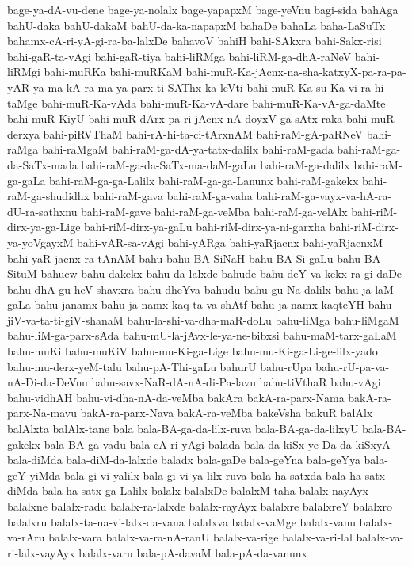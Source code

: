 {bage-ya-dA-vu-dene
bage-ya-nolalx
bage-yapapxM
bage-yeVnu
bagi-sida
bahAga
bahU-daka
bahU-dakaM
bahU-da-ka-napapxM
bahaDe
bahaLa
baha-LaSuTx
bahamx-cA-ri-yA-gi-ra-ba-lalxDe
bahavoV
bahiH
bahi-SAkxra
bahi-Sakx-risi
bahi-gaR-ta-vAgi
bahi-gaR-tiya
bahi-liRMga
bahi-liRM-ga-dhA-raNeV
bahi-liRMgi
bahi-muRKa
bahi-muRKaM
bahi-muR-Ka-jAcnx-na-sha-katxyX-pa-ra-pa-yAR-ya-ma-kA-ra-ma-ya-parx-ti-SAThx-ka-leVti
bahi-muR-Ka-su-Ka-vi-ra-hi-taMge
bahi-muR-Ka-vAda
bahi-muR-Ka-vA-dare
bahi-muR-Ka-vA-ga-daMte
bahi-muR-KiyU
bahi-muR-dArx-pa-ri-jAcnx-nA-doyxV-ga-sAtx-raka
bahi-muR-derxya
bahi-piRVThaM
bahi-rA-hi-ta-ci-tArxnAM
bahi-raM-gA-paRNeV
bahi-raMga
bahi-raMgaM
bahi-raM-ga-dA-ya-tatx-dalilx
bahi-raM-gada
bahi-raM-ga-da-SaTx-mada
bahi-raM-ga-da-SaTx-ma-daM-gaLu
bahi-raM-ga-dalilx
bahi-raM-ga-gaLa
bahi-raM-ga-ga-Lalilx
bahi-raM-ga-ga-Lanunx
bahi-raM-gakekx
bahi-raM-ga-shudidhx
bahi-raM-gava
bahi-raM-ga-vaha
bahi-raM-ga-vayx-va-hA-ra-dU-ra-sathxnu
bahi-raM-gave
bahi-raM-ga-veMba
bahi-raM-ga-velAlx
bahi-riM-dirx-ya-ga-Lige
bahi-riM-dirx-ya-gaLu
bahi-riM-dirx-ya-ni-garxha
bahi-riM-dirx-ya-yoVgayxM
bahi-vAR-sa-vAgi
bahi-yARga
bahi-yaRjacnx
bahi-yaRjacnxM
bahi-yaR-jacnx-ra-tAnAM
bahu
bahu-BA-SiNaH
bahu-BA-Si-gaLu
bahu-BA-SituM
bahucw
bahu-dakekx
bahu-da-lalxde
bahude
bahu-deY-va-kekx-ra-gi-daDe
bahu-dhA-gu-heV-shavxra
bahu-dheYva
bahudu
bahu-gu-Na-dalilx
bahu-ja-laM-gaLa
bahu-janamx
bahu-ja-namx-kaq-ta-va-shAtf
bahu-ja-namx-kaqteYH
bahu-jiV-va-ta-ti-giV-shanaM
bahu-la-shi-va-dha-maR-doLu
bahu-liMga
bahu-liMgaM
bahu-liM-ga-parx-sAda
bahu-mU-la-jAvx-le-ya-ne-bibxsi
bahu-maM-tarx-gaLaM
bahu-muKi
bahu-muKiV
bahu-mu-Ki-ga-Lige
bahu-mu-Ki-ga-Li-ge-lilx-yado
bahu-mu-derx-yeM-talu
bahu-pA-Thi-gaLu
bahurU
bahu-rUpa
bahu-rU-pa-va-nA-Di-da-DeVnu
bahu-savx-NaR-dA-nA-di-Pa-lavu
bahu-tiVthaR
bahu-vAgi
bahu-vidhAH
bahu-vi-dha-nA-da-veMba
bakAra
bakA-ra-parx-Nama
bakA-ra-parx-Na-mavu
bakA-ra-parx-Nava
bakA-ra-veMba
bakeVsha
bakuR
balAlx
balAlxta
balAlx-tane
bala
bala-BA-ga-da-lilx-ruva
bala-BA-ga-da-lilxyU
bala-BA-gakekx
bala-BA-ga-vadu
bala-cA-ri-yAgi
balada
bala-da-kiSx-ye-Da-da-kiSxyA
bala-diMda
bala-diM-da-lalxde
baladx
bala-gaDe
bala-geYna
bala-geYya
bala-geY-yiMda
bala-gi-vi-yalilx
bala-gi-vi-ya-lilx-ruva
bala-ha-satxda
bala-ha-satx-diMda
bala-ha-satx-ga-Lalilx
balalx
balalxDe
balalxM-taha
balalx-nayAyx
balalxne
balalx-radu
balalx-ra-lalxde
balalx-rayAyx
balalxre
balalxreY
balalxro
balalxru
balalx-ta-na-vi-lalx-da-vana
balalxva
balalx-vaMge
balalx-vanu
balalx-va-rAru
balalx-vara
balalx-va-ra-nA-ranU
balalx-va-rige
balalx-va-ri-lal
balalx-va-ri-lalx-vayAyx
balalx-varu
bala-pA-davaM
bala-pA-da-vanunx
}
